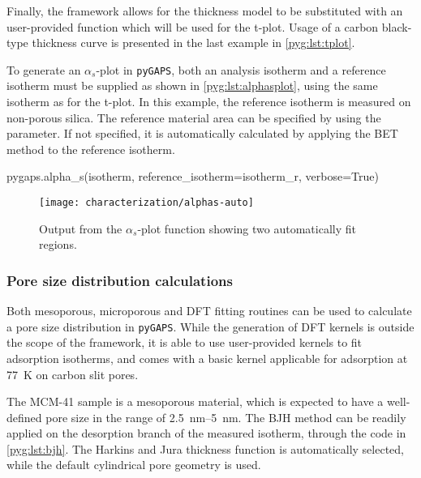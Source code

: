 Finally, the framework allows for the thickness model to be substituted
with an user-provided function which will be used for the t-plot.
Usage of a carbon black-type thickness curve is presented in the last
example in \autoref{pyg:lst:tplot}.

To generate an \(\alpha_s\)-plot in \texttt{pyGAPS}, both 
an analysis isotherm and a reference isotherm must be supplied 
as shown in \autoref{pyg:lst:alphasplot}, using the same isotherm
as for the t-plot.
In this example, the reference isotherm is measured on non-porous 
silica. The reference material area can be specified by using 
the  parameter. If not specified, it 
is automatically calculated by applying the BET
method to the reference isotherm.

\begin{python}[caption={Generating an \(\alpha_s\)-plot},label={pyg:lst:alphasplot}]
pygaps.alpha_s(isotherm, 
			   reference_isotherm=isotherm_r,
			   verbose=True)
\end{python}

\begin{figure}[!htb]
	\centering

	\texttt{[image: characterization/alphas-auto]}
	\caption{Output from the \(\alpha_s\)-plot function showing two
		automatically fit regions.}%
	\label{pyg:fgr:alphasplot}

\end{figure}


\subsubsection{Pore size distribution calculations}

Both mesoporous, microporous and DFT fitting routines can be
used to calculate a pore size distribution in \texttt{pyGAPS}. 
While the generation of DFT kernels is outside the scope of the
framework, it is able to use user-provided kernels to fit adsorption 
isotherms, and comes with a basic kernel applicable for  
adsorption at \SI{77}{\kelvin} on carbon slit pores.

The MCM-41 sample is a mesoporous material, which is expected
to have a well-defined pore size in the range of 
\SIrange{2.5}{5}{\nano\metre}. The BJH method can be readily
applied on the desorption branch of the measured isotherm, through
the code in \autoref{pyg:lst:bjh}. The Harkins and Jura thickness
function is automatically selected, while the default cylindrical pore 
geometry is used.

